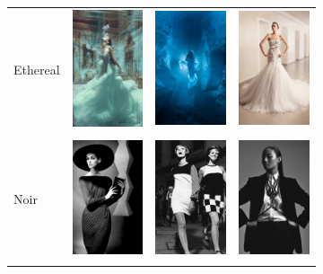 \begin{figure}
\begin{subfigure}[t]{0.48\linewidth}
\begin{tabular}{m{.02in}|m{\dgap} m{\dgap} m{\dgap}}
    \begin{turn}{90}\small{Ethereal}\end{turn} &
    \includegraphics[width=.53in]{../style/figures/flickr_on_pinterest/dress/pred_style_Ethereal/h/0.jpg} &
    \includegraphics[width=.53in]{../style/figures/flickr_on_pinterest/dress/pred_style_Ethereal/h/1.jpg} &
    \includegraphics[width=.53in]{../style/figures/flickr_on_pinterest/dress/pred_style_Ethereal/h/2.jpg} \\ \\
    \begin{turn}{90}\small{Noir}\end{turn} &
    \includegraphics[width=.53in]{../style/figures/flickr_on_pinterest/dress/pred_style_Noir/h/0.jpg} &
    \includegraphics[width=.53in]{../style/figures/flickr_on_pinterest/dress/pred_style_Noir/h/1.jpg} &
    \includegraphics[width=.53in]{../style/figures/flickr_on_pinterest/dress/pred_style_Noir/h/2.jpg} \\ \\

\end{tabular}
\end{subfigure}
\end{figure}

